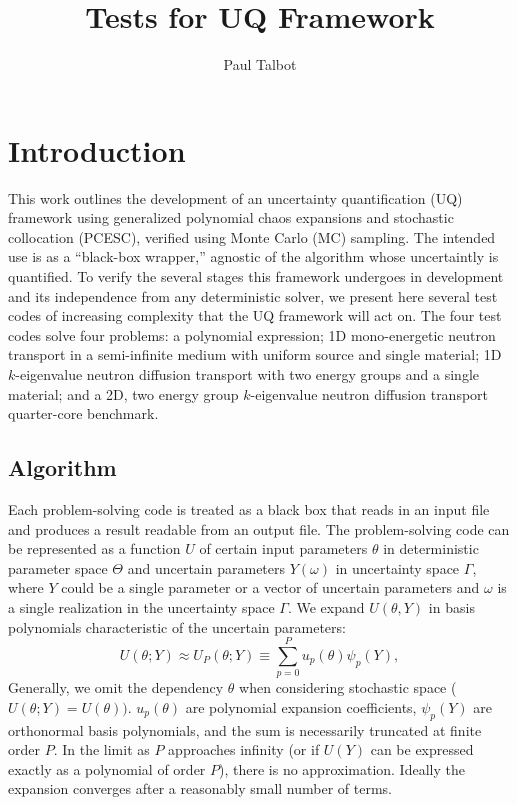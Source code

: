 \documentclass[11pt]{article} %
\title{Tests for UQ Framework}
\author{Paul Talbot}
\begin{document}
\maketitle
\section{Introduction}
This work outlines the development of an uncertainty quantification (UQ) framework using generalized polynomial chaos expansions and stochastic collocation (PCESC), verified using Monte Carlo (MC) sampling.  The intended use is as a ``black-box wrapper,'' agnostic of the algorithm whose uncertaintly is quantified.  To verify the several stages this framework undergoes in development and its independence from any deterministic solver, we present here several test codes of increasing complexity that the UQ framework will act on.  The four test codes solve four problems: a polynomial expression; 1D mono-energetic neutron transport in a semi-infinite medium with uniform source and single material; 1D $k$-eigenvalue neutron diffusion transport with two energy groups and a single material; and a 2D, two energy group $k$-eigenvalue neutron diffusion transport quarter-core benchmark.

\subsection{Algorithm}
Each problem-solving code is treated as a black box that reads in an input file and produces a result readable from an output file.  The problem-solving code can be represented as a function $U$ of certain input parameters $\theta$ in deterministic parameter space $\Theta$ and uncertain parameters $Y(\omega)$ in uncertainty space $\Gamma$, where $Y$ could be a single parameter or a vector of uncertain parameters and $\omega$ is a single realization in the uncertainty space $\Gamma$.  We expand $U(\theta,Y)$ in basis polynomials characteristic of the uncertain parameters:
\begin{equation}
U(\theta;Y)\approx U_P(\theta;Y) \equiv \sum_{p=0}^P u_p(\theta) \psi_p(Y),
\end{equation}
Generally, we omit the dependency $\theta$ when considering stochastic space ($U(\theta;Y)=U(\theta))$.
$u_p(\theta)$ are polynomial expansion coefficients, $\psi_p(Y)$ are orthonormal basis polynomials, and the sum is necessarily truncated at finite order $P$.  In the limit as $P$ approaches infinity (or if $U(Y)$ can be expressed exactly as a polynomial of order $P$), there is no approximation.  Ideally the expansion converges after a reasonably small number of terms.
\end{document}
